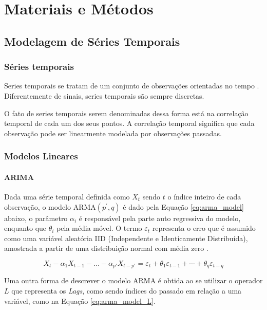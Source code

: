 \chapter{Materiais e Métodos}
\label{cap:materiais_e_metodos}

\section{Modelagem de Séries Temporais}
\label{sec:series_temp}

\subsection{Séries temporais}

Series temporais se tratam de um conjunto de observações orientadas no tempo \cite{brockwell2002introduction}. Diferentemente de sinais, series temporais são sempre discretas.

O fato de series temporais serem denominadas dessa forma está na correlação temporal de cada um dos seus pontos. A correlação temporal significa que cada observação pode ser linearmente modelada por observações passadas. 

\subsection{Modelos Lineares}

\subsubsection{ARIMA}

Dada uma série temporal definida como $X_t$ sendo $t$ o índice inteiro de cada observação, o modelo ARMA$(p^{'},q)$ é dado pela Equação \ref{eq:arma_model} abaixo, o parâmetro $\alpha_i$ é responsável pela parte auto regressiva do modelo, enquanto que $\theta_i$ pela média móvel. O termo $\varepsilon_t$ representa o erro que é assumido como uma variável aleatória IID (Independente e Identicamente Distribuída), amostrada a partir de uma distribuição normal com média zero \cite{brockwell2002introduction}. 

\begin{equation}
\label{eq:arma_model}
    X_t-\alpha_1X_{t-1}- \dots -\alpha_{p'}X_{t-p'} = \varepsilon_t + \theta_1 \varepsilon_{t-1} + \cdots +\theta_q \varepsilon_{t-q}
\end{equation}

Uma outra forma de descrever o modelo ARMA é obtida ao se utilizar o operador $L$ que representa os \textit{Lags}, como sendo índices do passado em relação a uma variável, como na Equação \ref{eq:arma_model_L}.


